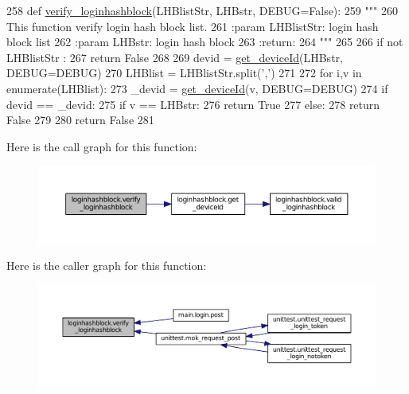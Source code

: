 \begin{DoxyCode}
258 \textcolor{keyword}{def }\hyperlink{namespaceloginhashblock_aa5bb94484a68d0bbebce23b4cfeeb4b7}{verify\_loginhashblock}(LHBlistStr, LHBstr, DEBUG=False):
259     \textcolor{stringliteral}{"""}
260 \textcolor{stringliteral}{    This function verify login hash block list.}
261 \textcolor{stringliteral}{    :param LHBlistStr: login hash block list}
262 \textcolor{stringliteral}{    :param LHBstr: login hash block}
263 \textcolor{stringliteral}{    :return:}
264 \textcolor{stringliteral}{    """}
265 
266     \textcolor{keywordflow}{if} \textcolor{keywordflow}{not} LHBlistStr :
267         \textcolor{keywordflow}{return} \textcolor{keyword}{False}
268 
269     devid = \hyperlink{namespaceloginhashblock_a17417f2f6bca76ab51170082a562e5f6}{get\_deviceId}(LHBstr, DEBUG=DEBUG)
270     LHBlist = LHBlistStr.split(\textcolor{stringliteral}{','})
271 
272     \textcolor{keywordflow}{for} i,v \textcolor{keywordflow}{in} enumerate(LHBlist):
273         \_devid = \hyperlink{namespaceloginhashblock_a17417f2f6bca76ab51170082a562e5f6}{get\_deviceId}(v, DEBUG=DEBUG)
274         \textcolor{keywordflow}{if} devid == \_devid:
275             \textcolor{keywordflow}{if} v == LHBstr:
276                 \textcolor{keywordflow}{return} \textcolor{keyword}{True}
277             \textcolor{keywordflow}{else}:
278                 \textcolor{keywordflow}{return} \textcolor{keyword}{False}
279 
280     \textcolor{keywordflow}{return} \textcolor{keyword}{False}
281 
\end{DoxyCode}


Here is the call graph for this function\+:\nopagebreak
\begin{figure}[H]
\begin{center}
\leavevmode
\includegraphics[width=350pt]{namespaceloginhashblock_aa5bb94484a68d0bbebce23b4cfeeb4b7_cgraph}
\end{center}
\end{figure}




Here is the caller graph for this function\+:\nopagebreak
\begin{figure}[H]
\begin{center}
\leavevmode
\includegraphics[width=350pt]{namespaceloginhashblock_aa5bb94484a68d0bbebce23b4cfeeb4b7_icgraph}
\end{center}
\end{figure}




